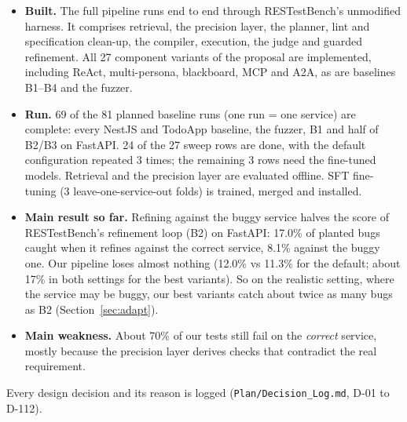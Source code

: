 \documentclass[11pt,a4paper]{article}
\begin{document}
\begin{itemize}
\item \textbf{Built.} The full pipeline runs end to end through RESTestBench's unmodified harness. It comprises retrieval, the precision layer, the planner, lint and specification clean-up, the compiler, execution, the judge and guarded refinement. All 27 component variants of the proposal are implemented, including ReAct, multi-persona, blackboard, MCP and A2A, as are baselines B1--B4 and the fuzzer.
\item \textbf{Run.} 69 of the 81 planned baseline runs (one run = one service) are complete: every NestJS and TodoApp baseline, the fuzzer, B1 and half of B2/B3 on FastAPI. 24 of the 27 sweep rows are done, with the default configuration repeated 3 times; the remaining 3 rows need the fine-tuned models. Retrieval and the precision layer are evaluated offline. SFT fine-tuning (3 leave-one-service-out folds) is trained, merged and installed.
\item \textbf{Main result so far.} Refining against the buggy service halves the score of RESTestBench's refinement loop (B2) on FastAPI: 17.0\% of planted bugs caught when it refines against the correct service, 8.1\% against the buggy one. Our pipeline loses almost nothing (12.0\% vs 11.3\% for the default; about 17\% in both settings for the best variants). So on the realistic setting, where the service may be buggy, our best variants catch about twice as many bugs as B2 (Section~\ref{sec:adapt}).
\item \textbf{Main weakness.} About 70\% of our tests still fail on the \emph{correct} service, mostly because the precision layer derives checks that contradict the real requirement.
\end{itemize}
Every design decision and its reason is logged (\texttt{Plan/Decision\_Log.md}, D-01 to D-112).

\end{document}
